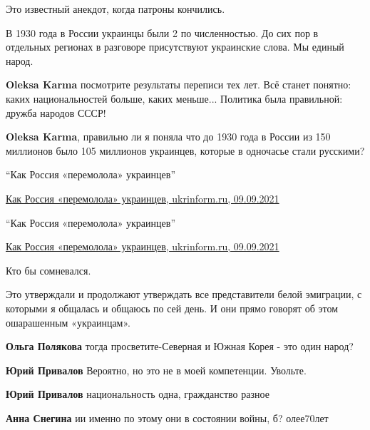 \begin{itemize}
\begin{itemize}
Это известный анекдот, когда патроны кончились.
\end{itemize} %


В 1930 года в России украинцы были 2 по численностью. До сих пор в отдельных
регионах в разговоре присутствуют украинские слова. Мы единый народ.

\begin{itemize} %
\textbf{Oleksa Karma} посмотрите результаты переписи тех лет. Всё станет понятно: каких национальностей больше, каких меньше... Политика была правильной: дружба народов СССР!

\textbf{Oleksa Karma}, правильно ли я поняла что до 1930 года в России из 150 миллионов было 105 миллионов украинцев, которые в одночасье стали русскими?

\enquote{Как Россия «перемолола» украинцев}

\href{https://www.ukrinform.ru/amp/rubric-antifake/3312829-kak-rossia-peremolola-ukraincev.html}{%
Как Россия «перемолола» украинцев, ukrinform.ru, 09.09.2021%
}

\enquote{Как Россия «перемолола» украинцев}

\href{https://www.ukrinform.ru/amp/rubric-antifake/3312829-kak-rossia-peremolola-ukraincev.html}{%
Как Россия «перемолола» украинцев, ukrinform.ru, 09.09.2021%
}

\end{itemize} %

Кто бы сомневался.


Это утверждали и продолжают утверждать все представители белой эмиграции, с
которыми я общалась и общаюсь по сей день. И они прямо говорят об этом
ошарашенным «украинцам».

\begin{itemize} %
\textbf{Ольга Полякова} тогда просветите-Северная и Южная Корея - это один народ?

\textbf{Юрий Привалов} Вероятно, но это не в моей компетенции. Увольте.

\textbf{Юрий Привалов} национальность одна, гражданство разное

\textbf{Анна Снегина} ии именно по этому они в состоянии войны, б? олее70лет


\end{itemize}
\end{itemize}
